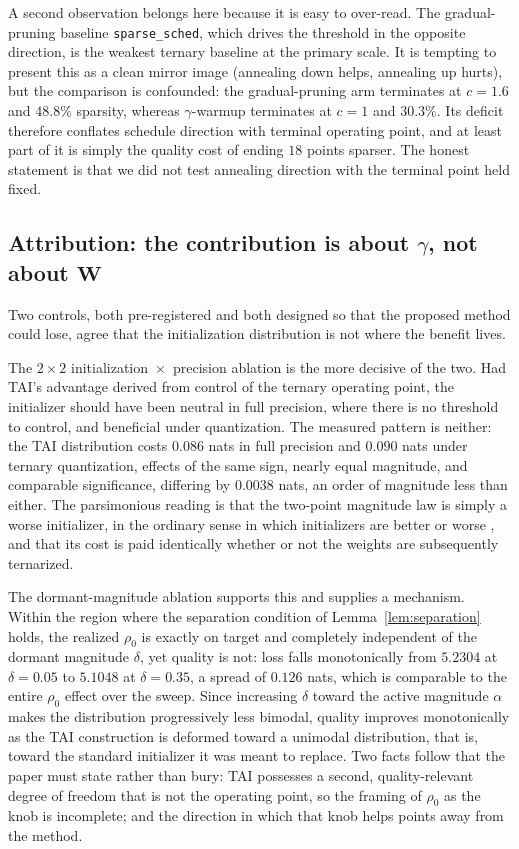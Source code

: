 \documentclass[final,5p,times,twocolumn]{elsarticle}
\theoremstyle{remark}
\newcommand{\Wm}{\mathbf{W}}
\newcommand{\rhoz}{\rho_{0}}
\begin{document}
A second observation belongs here because it is easy to over-read. The
gradual-pruning baseline \texttt{sparse\_sched}, which drives the threshold in
the opposite direction, is the weakest ternary baseline at the primary scale. It is tempting to
present this as a clean mirror image (annealing down helps, annealing up
hurts), but the comparison is confounded: the gradual-pruning arm terminates at
$c = 1.6$ and $48.8\%$ sparsity, whereas $\gamma$-warmup terminates at $c = 1$
and $30.3\%$. Its deficit therefore conflates schedule direction with terminal
operating point, and at least part of it is simply the quality cost of ending
$18$ points sparser. The honest statement is that we did not test annealing
direction with the terminal point held fixed.

\subsection{Attribution: the contribution is about $\gamma$, not about $\Wm$}
\label{sec:disc-attribution}

Two controls, both pre-registered and both designed so that the proposed method
could lose, agree that the initialization distribution is not where the benefit
lives.

The $2\times 2$ initialization~$\times$~precision ablation is the more decisive
of the two. Had TAI's advantage derived from control of the ternary operating
point, the initializer should have been neutral in full precision, where there
is no threshold to control, and beneficial under quantization. The measured
pattern is neither: the TAI distribution costs $0.086$ nats in full precision
and $0.090$ nats under ternary quantization, effects of the same sign, nearly
equal magnitude, and comparable significance, differing by $0.0038$ nats, an
order of magnitude less than either. The parsimonious reading is that the
two-point magnitude law is simply a worse initializer, in the ordinary sense in
which initializers are better or worse \cite{glorot2010,he2015},
and that its cost is paid identically whether or not the weights are
subsequently ternarized.

The dormant-magnitude ablation supports this and supplies a mechanism. Within the region where the separation condition of
Lemma~\ref{lem:separation} holds, the realized $\rhoz$ is exactly on target and
completely independent of the dormant magnitude $\delta$, yet quality is not:
loss falls monotonically from $5.2304$ at $\delta = 0.05$ to $5.1048$ at
$\delta = 0.35$, a spread of $0.126$ nats, which is comparable to the entire
$\rhoz$ effect over the sweep. Since increasing $\delta$ toward the active
magnitude $\alpha$ makes the distribution progressively less bimodal, quality
improves monotonically as the TAI construction is deformed toward a unimodal
distribution, that is, toward the standard initializer it was meant to
replace. Two facts follow that the paper must state rather than bury: TAI
possesses a second, quality-relevant degree of freedom that is not the
operating point, so the framing of $\rhoz$ as the knob is incomplete; and the
direction in which that knob helps points away from the method.
\end{document}

